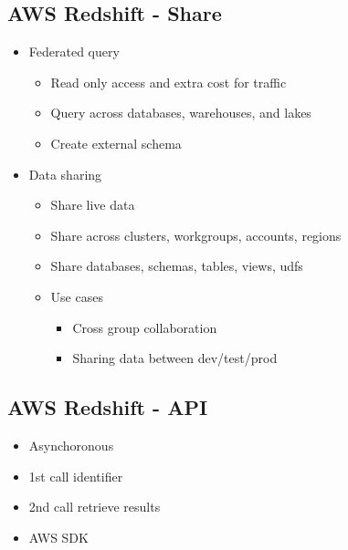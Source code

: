 \documentclass[../../main.tex]{subfiles}
\begin{document}
\subsection{AWS Redshift - Share}
\begin{itemize}
    \item Federated query
    \begin{itemize}
        \item Read only access and extra cost for traffic
        \item Query across databases, warehouses, and lakes
        \item Create external schema
    \end{itemize}
    \item Data sharing
    \begin{itemize}
        \item Share live data
        \item Share across clusters, workgroups, accounts, regions
        \item Share databases, schemas, tables, views, udfs
        \item Use cases
        \begin{itemize}
            \item Cross group collaboration
            \item Sharing data between dev/test/prod
        \end{itemize}
    \end{itemize}
\end{itemize}

\subsection{AWS Redshift - API}
\begin{itemize}
    \item Asynchoronous
    \item 1st call identifier
    \item 2nd call retrieve results
    \item AWS SDK
\end{itemize}
\end{document}
